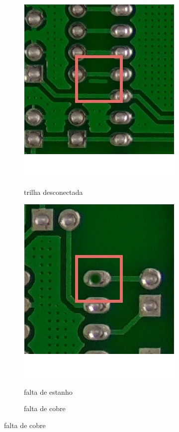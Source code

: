 \begin{figure}[H]
    \centering
    \caption{Tipos de defeito de fabricação em placas de circuito impresso.}
    \begin{subfigure}[H]{0.3\textwidth}
        \centering
        \caption{trilha desconectada}
        \includegraphics[scale=0.6]{img/img-fundamentacao-defeitos.pdf}
        \label{fig:fund-defeitos1}
    \end{subfigure}
    \begin{subfigure}[H]{0.3\textwidth}
        \centering
        \caption{falta de estanho}
        \includegraphics[scale=0.6]{img/img-fundamentacao-defeitos2.pdf}
        \label{fig:fund-defeitos2}
    \end{subfigure}
    \begin{subfigure}[H]{0.3\textwidth}
        \centering
        \caption{falta de cobre}

\end{subfigure}
\end{figure}
